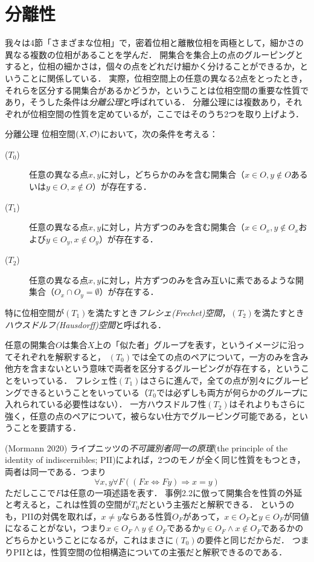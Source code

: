 \documentclass[11pt,a4paper, dvipdfmx]{jsarticle}
\begin{document}
\section{分離性}
我々は4節「さまざまな位相」で，密着位相と離散位相を両極として，細かさの異なる複数の位相があることを学んだ．
開集合を集合上の点のグルーピングとすると，位相の細かさは，個々の点をどれだけ細かく分けることができるか，ということに関係している．
実際，位相空間上の任意の異なる2点をとったとき，それらを区分する開集合があるかどうか，ということは位相空間の重要な性質であり，そうした条件は\emph{分離公理}と呼ばれている．
分離公理には複数あり，それぞれが位相空間の性質を定めているが，ここではそのうち2つを取り上げよう．

\begin{dfn}{分離公理}
位相空間$(X, \mathcal{O})$において，次の条件を考える：
\begin{description}
 \item[($T_0$)] 任意の異なる点$x, y$に対し，どちらかのみを含む開集合（$x \in O, y \not\in O$あるいは$y \in O, x \not\in O$）が存在する．
 \item[($T_1$)] 任意の異なる点$x, y$に対し，片方ずつのみを含む開集合（$x \in O_x, y \not\in O_x$および$y \in O_y, x \not\in O_y$）が存在する．
 \item[($T_2$)] 任意の異なる点$x, y$に対し，片方ずつのみを含み互いに素であるような開集合（$O_x \cap O_y = \emptyset$）が存在する．
\end{description} 
特に位相空間が$(T_1)$を満たすとき\emph{フレシェ(Frechet)空間}，$(T_2)$を満たすとき\emph{ハウスドルフ(Hausdorff)空間}と呼ばれる．
\end{dfn}

任意の開集合$O$は集合$X$上の「似た者」グループを表す，というイメージに沿ってそれぞれを解釈すると，
$(T_0)$では全ての点のペアについて，一方のみを含み他方を含まないという意味で両者を区分するグルーピングが存在する，ということをいっている．
フレシェ性$(T_1)$はさらに進んで，全ての点が別々にグルーピングできるということをいっている（$T_0$では必ずしも両方が何らかのグループに入れられている必要性はない）．
一方ハウスドルフ性$(T_2)$はそれよりもさらに強く，任意の点のペアについて，被らない仕方でグルーピング可能である，ということを要請する．

\begin{example}(Mormann 2020)
ライプニッツの\emph{不可識別者同一の原理}(the principle of the identity of indiscernibles; PII)によれば，2つのモノが全く同じ性質をもつとき，両者は同一である．つまり
\[
 \forall x, y \forall F ((Fx  \Leftrightarrow Fy) \Rightarrow x=y)
\]
ただしここで$F$は任意の一項述語を表す．
事例2.2に倣って開集合を性質の外延と考えると，これは性質の空間が$T_0$だという主張だと解釈できる．
というのも，PIIの対偶を取れば，$x\neq y$ならある性質$O_F$があって，$x \in O_F$と$y \in O_F$が同値になることがない，つまり$x \in O_F \wedge y \not\in O_F$であるか$y \in O_F \wedge x \not\in O_F$であるかのどちらかということになるが，これはまさに$(T_0)$の要件と同じだからだ．
つまりPIIとは，性質空間の位相構造についての主張だと解釈できるのである．
\end{example}
\end{document}
